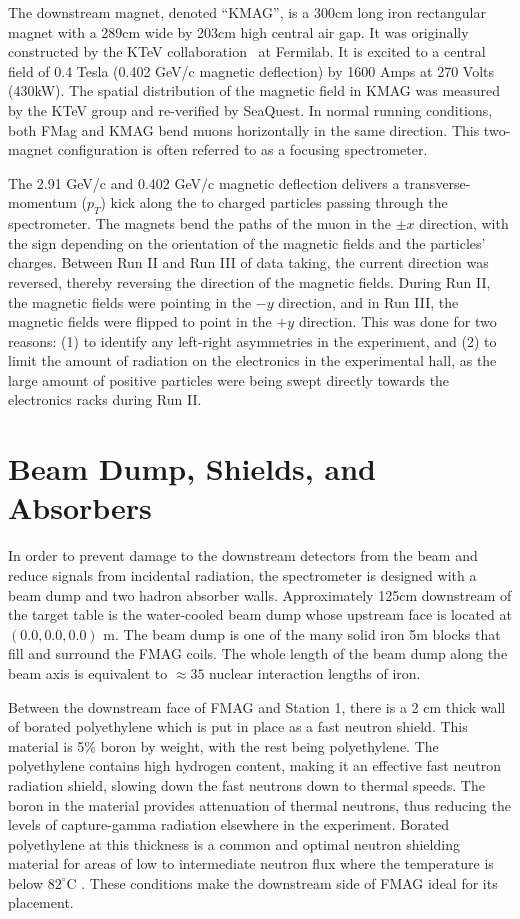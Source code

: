 The downstream magnet, denoted ``KMAG'', is a 300cm long iron rectangular magnet with a 289cm wide by 203cm high central air gap.  It was originally constructed by the KTeV collaboration~\cite{PhysRevD.67.012005} at Fermilab.  It is excited to a central field of 0.4 Tesla (0.402 GeV/c magnetic deflection) by 1600 Amps at 270 Volts (430kW).  The spatial distribution of the magnetic field in KMAG was measured by the KTeV group and re-verified by SeaQuest.  In normal running conditions, both FMag and KMAG bend muons horizontally in the same direction. This two-magnet configuration is often referred to as a focusing spectrometer.

The 2.91 GeV/c and 0.402 GeV/c magnetic deflection delivers a transverse-momentum ($p_T$) kick along the to charged particles passing through the spectrometer. The magnets bend the paths of the muon in the $\pm x$ direction, with the sign depending on the orientation of the magnetic fields and the particles' charges. Between Run II and Run III of data taking, the current direction was reversed, thereby reversing the direction of the magnetic fields. During Run II, the magnetic fields were pointing in the $-y$ direction, and in Run III, the magnetic fields were flipped to point in the $+y$ direction. This was done for two reasons: (1) to identify any left-right asymmetries in the experiment, and (2) to limit the amount of radiation on the electronics in the experimental hall, as the large amount of positive particles were being swept directly towards the electronics racks during Run II.

\section{Beam Dump, Shields, and Absorbers}

In order to prevent damage to the downstream detectors from the beam and reduce signals from incidental radiation, the spectrometer is designed with a beam dump and two hadron absorber walls. Approximately 125cm downstream of the target table
is the water-cooled beam dump whose upstream face is located at $(0.0, 0.0, 0.0)$ m. The beam dump is one of the many solid iron 5m blocks that fill and surround the FMAG coils. The whole length of the beam dump along the beam axis is equivalent to $\approx 35$ nuclear interaction lengths of iron. 

Between the downstream face of FMAG and Station 1, there is a 2 cm thick wall of borated polyethylene which is put in place as a fast neutron shield. This material is 5\% boron by weight, with the rest being polyethylene. The polyethylene contains high hydrogen content, making it an effective fast neutron radiation shield, slowing down the fast neutrons down to thermal speeds. The boron in the material provides attenuation of thermal neutrons, thus reducing the levels of capture-gamma radiation elsewhere in the experiment. Borated polyethylene at this thickness is a common and optimal neutron shielding material for areas of low to intermediate neutron flux where the temperature is below $82^\circ$C \CN. These conditions make the downstream side of FMAG ideal for its placement.

